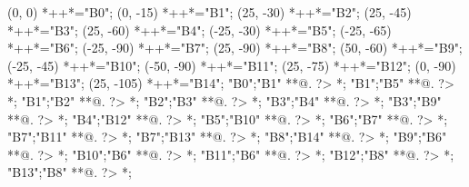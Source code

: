 \begin{scriptsize}
\xy(0, 0)
	*++{}*\frm{-,}="B0";
(0, -15)
	*++{}*\frm{-,}="B1";
(25, -30)
	*++{}*\frm{-,}="B2";
(25, -45)
	 *++{}*\frm{-,}="B3";
(25, -60)
	*++{}*\frm{-,}="B4";
(-25, -30)
	*++{}*\frm{-,}="B5";
(-25, -65)
	 *++{}*\frm{-,}="B6";
(-25, -90)
	 *++{}*\frm{-,}="B7";
(25, -90)
	*++{}*\frm{-,}="B8";
(50, -60)
	*++{}*\frm{-,}="B9";
(-25, -45)
	*++{}*\frm{-,}="B10";
(-50, -90)
	*++{}*\frm{-,}="B11";
(25, -75)
	*++{}*\frm{-,}="B12";
(0, -90)
	*++{}*\frm{-,}="B13";
(25, -105)
	*++{}*\frm{-,}="B14";
"B0";"B1" **@{.} ?> *{\dir{>}};
"B1";"B5" **@{.} ?> *{\dir{>}};
"B1";"B2" **@{.} ?> *{\dir{>}};
"B2";"B3" **@{.} ?> *{\dir{>}};
"B3";"B4" **@{.} ?> *{\dir{>}};
"B3";"B9" **@{.} ?> *{\dir{>}};
"B4";"B12" **@{.} ?> *{\dir{>}};
"B5";"B10" **@{.} ?> *{\dir{>}};
"B6";"B7" **@{.} ?> *{\dir{>}};
"B7";"B11" **@{.} ?> *{\dir{>}};
"B7";"B13" **@{.} ?> *{\dir{>}};
"B8";"B14" **@{.} ?> *{\dir{>}};
"B9";"B6" **@{.} ?> *{\dir{>}};
"B10";"B6" **@{.} ?> *{\dir{>}};
"B11";"B6" **@{.} ?> *{\dir{>}};
"B12";"B8" **@{.} ?> *{\dir{>}};
"B13";"B8" **@{.} ?> *{\dir{>}};
\endxy
\end{scriptsize}



